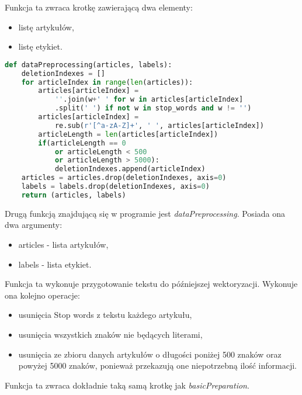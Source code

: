 Funkcja ta zwraca krotkę zawierającą dwa elementy:
\begin{itemize}
    \item listę artykułów,
    \item listę etykiet.
\end{itemize} 

\begin{lstlisting}[language=Python, caption={Funkcja przygotowywująca dane tekstowe}, captionpos=b, frame=single]
def dataPreprocessing(articles, labels):
    deletionIndexes = []
    for articleIndex in range(len(articles)):
        articles[articleIndex] = 
            ''.join(w+' ' for w in articles[articleIndex]
            .split(' ') if not w in stop_words and w != '')  
        articles[articleIndex] = 
            re.sub(r'[^a-zA-Z]+', ' ', articles[articleIndex])
        articleLength = len(articles[articleIndex])
        if(articleLength == 0 
            or articleLength < 500 
            or articleLength > 5000):
            deletionIndexes.append(articleIndex) 
    articles = articles.drop(deletionIndexes, axis=0)
    labels = labels.drop(deletionIndexes, axis=0)
    return (articles, labels)

\end{lstlisting}

Drugą funkcją znajdującą się w programie jest \textit{dataPreprocessing}. Posiada 
ona dwa argumenty:
\begin{itemize}
    \item articles - lista artykułów,
    \item labels - lista etykiet.
\end{itemize}
Funkcja ta wykonuje przygotowanie tekstu do późniejszej wektoryzacji. Wykonuje ona 
kolejno operacje:
\begin{itemize}
    \item usunięcia Stop words z tekstu każdego artykułu,
    \item usunięcia wszystkich znaków nie będących literami,
    \item usunięcia ze zbioru danych artykułów o długości poniżej 500 znaków oraz powyżej 5000 znaków,
    ponieważ przekazują one niepotrzebną ilość informacji.
\end{itemize}
Funkcja ta zwraca dokładnie taką samą krotkę jak \textit{basicPreparation}.


